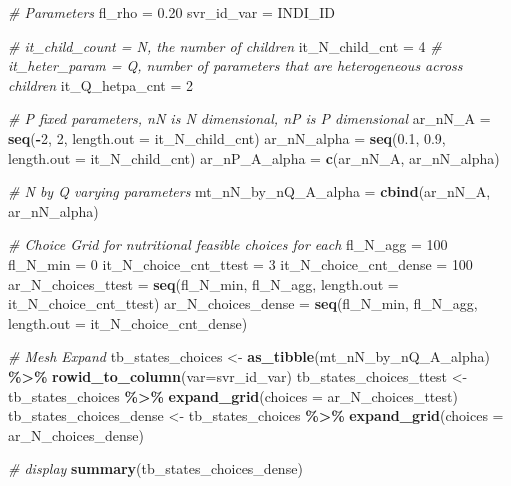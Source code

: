 \documentclass[
]{book}
\newenvironment{Shaded}{\begin{snugshade}}{\end{snugshade}}
\newcommand{\CommentTok}[1]{\textcolor[rgb]{0.56,0.35,0.01}{\textit{#1}}}
\newcommand{\DataTypeTok}[1]{\textcolor[rgb]{0.13,0.29,0.53}{#1}}
\newcommand{\DecValTok}[1]{\textcolor[rgb]{0.00,0.00,0.81}{#1}}
\newcommand{\FloatTok}[1]{\textcolor[rgb]{0.00,0.00,0.81}{#1}}
\newcommand{\KeywordTok}[1]{\textcolor[rgb]{0.13,0.29,0.53}{\textbf{#1}}}
\newcommand{\NormalTok}[1]{#1}
\newcommand{\OperatorTok}[1]{\textcolor[rgb]{0.81,0.36,0.00}{\textbf{#1}}}
\newcommand{\StringTok}[1]{\textcolor[rgb]{0.31,0.60,0.02}{#1}}
\begin{document}
\begin{Shaded}
\begin{Highlighting}[]
\CommentTok{\# Parameters}
\NormalTok{fl\_rho =}\StringTok{ }\FloatTok{0.20}
\NormalTok{svr\_id\_var =}\StringTok{ \textquotesingle{}INDI\_ID\textquotesingle{}}

\CommentTok{\# it\_child\_count = N, the number of children}
\NormalTok{it\_N\_child\_cnt =}\StringTok{ }\DecValTok{4}
\CommentTok{\# it\_heter\_param = Q, number of parameters that are heterogeneous across children}
\NormalTok{it\_Q\_hetpa\_cnt =}\StringTok{ }\DecValTok{2}

\CommentTok{\# P fixed parameters, nN is N dimensional, nP is P dimensional}
\NormalTok{ar\_nN\_A =}\StringTok{ }\KeywordTok{seq}\NormalTok{(}\OperatorTok{{-}}\DecValTok{2}\NormalTok{, }\DecValTok{2}\NormalTok{, }\DataTypeTok{length.out =}\NormalTok{ it\_N\_child\_cnt)}
\NormalTok{ar\_nN\_alpha =}\StringTok{ }\KeywordTok{seq}\NormalTok{(}\FloatTok{0.1}\NormalTok{, }\FloatTok{0.9}\NormalTok{, }\DataTypeTok{length.out =}\NormalTok{ it\_N\_child\_cnt)}
\NormalTok{ar\_nP\_A\_alpha =}\StringTok{ }\KeywordTok{c}\NormalTok{(ar\_nN\_A, ar\_nN\_alpha)}

\CommentTok{\# N by Q varying parameters}
\NormalTok{mt\_nN\_by\_nQ\_A\_alpha =}\StringTok{ }\KeywordTok{cbind}\NormalTok{(ar\_nN\_A, ar\_nN\_alpha)}

\CommentTok{\# Choice Grid for nutritional feasible choices for each}
\NormalTok{fl\_N\_agg =}\StringTok{ }\DecValTok{100}
\NormalTok{fl\_N\_min =}\StringTok{ }\DecValTok{0}
\NormalTok{it\_N\_choice\_cnt\_ttest =}\StringTok{ }\DecValTok{3}
\NormalTok{it\_N\_choice\_cnt\_dense =}\StringTok{ }\DecValTok{100}
\NormalTok{ar\_N\_choices\_ttest =}\StringTok{ }\KeywordTok{seq}\NormalTok{(fl\_N\_min, fl\_N\_agg, }\DataTypeTok{length.out =}\NormalTok{ it\_N\_choice\_cnt\_ttest)}
\NormalTok{ar\_N\_choices\_dense =}\StringTok{ }\KeywordTok{seq}\NormalTok{(fl\_N\_min, fl\_N\_agg, }\DataTypeTok{length.out =}\NormalTok{ it\_N\_choice\_cnt\_dense)}

\CommentTok{\# Mesh Expand}
\NormalTok{tb\_states\_choices \textless{}{-}}\StringTok{ }\KeywordTok{as\_tibble}\NormalTok{(mt\_nN\_by\_nQ\_A\_alpha) }\OperatorTok{\%\textgreater{}\%}\StringTok{ }\KeywordTok{rowid\_to\_column}\NormalTok{(}\DataTypeTok{var=}\NormalTok{svr\_id\_var)}
\NormalTok{tb\_states\_choices\_ttest \textless{}{-}}\StringTok{ }\NormalTok{tb\_states\_choices }\OperatorTok{\%\textgreater{}\%}\StringTok{ }\KeywordTok{expand\_grid}\NormalTok{(}\DataTypeTok{choices =}\NormalTok{ ar\_N\_choices\_ttest)}
\NormalTok{tb\_states\_choices\_dense \textless{}{-}}\StringTok{ }\NormalTok{tb\_states\_choices }\OperatorTok{\%\textgreater{}\%}\StringTok{ }\KeywordTok{expand\_grid}\NormalTok{(}\DataTypeTok{choices =}\NormalTok{ ar\_N\_choices\_dense)}

\CommentTok{\# display}
\KeywordTok{summary}\NormalTok{(tb\_states\_choices\_dense)}
\end{Highlighting}
\end{Shaded}
\end{document}
